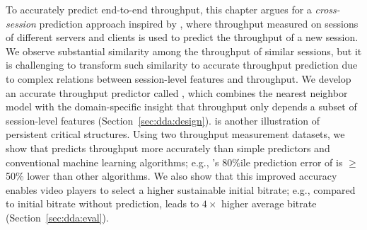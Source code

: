 To accurately predict end-to-end throughput, this chapter 
argues for a {\em cross-session} prediction approach inspired by \ddn, 
where throughput measured on sessions of different servers and clients 
is used to predict the throughput of a new session.
We observe substantial similarity among the throughput of similar sessions, 
but it is challenging to transform such similarity to accurate throughput
prediction due to complex relations between session-level features 
and throughput. 
We develop an accurate throughput predictor called {\em \name}, which 
combines the nearest neighbor model with the domain-specific 
insight that throughput only depends a subset of session-level features 
(Section~\ref{sec:dda:design}). \name is another illustration of persistent 
critical structures.
Using two throughput measurement datasets, we show that \name 
predicts throughput more accurately than simple predictors and 
conventional machine learning algorithms; e.g., \name's 80\%ile 
prediction error of \name is $\geq$ 50\% lower than other algorithms. 
We also show that this 
improved accuracy enables video players to select a higher 
sustainable initial bitrate; e.g., compared to initial bitrate without 
prediction, \name leads to $4\times$ higher average bitrate 
(Section~\ref{sec:dda:eval}).



